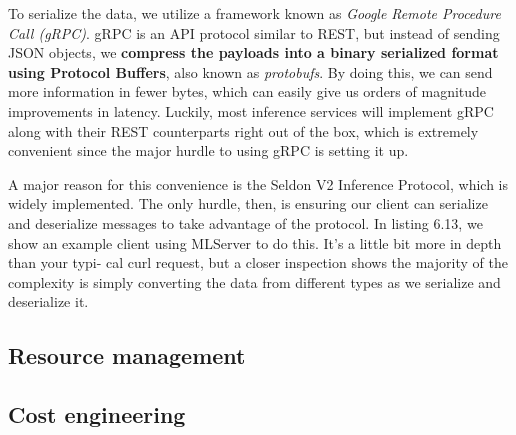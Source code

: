 To serialize the data, we utilize a framework known as \textit{Google Remote Procedure Call (gRPC)}. gRPC is an API protocol similar to REST, but instead of sending JSON objects, we \textbf{compress the payloads into a binary serialized format using Protocol Buffers}, also known as \textit{protobufs}. By doing this, we can send more information in fewer bytes, which can easily give us orders of magnitude improvements in latency. Luckily, most inference services will implement gRPC along with their REST counterparts right out of the box, which is extremely convenient since the major hurdle to using gRPC is setting it up. 

A major reason for this convenience is the Seldon V2 Inference Protocol, which is widely implemented. The only hurdle, then, is ensuring our client can serialize and deserialize messages to take advantage of the protocol. In listing 6.13, we show an example client using MLServer to do this. It's a little bit more in depth than your typi- cal curl request, but a closer inspection shows the majority of the complexity is simply converting the data from different types as we serialize and deserialize it.

\subsection{Resource management}
\subsection{Cost engineering}


